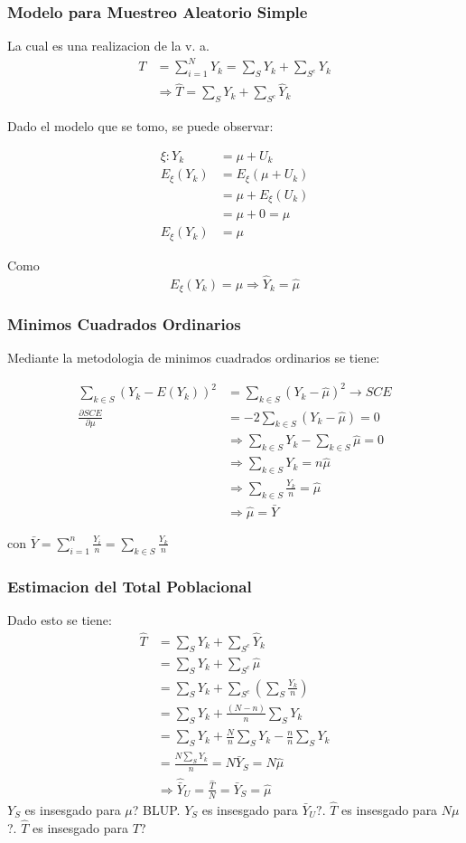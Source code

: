 ﻿\documentclass{beamer}
\begin{document}
\begin{frame}[allowframebreaks*]
\frametitle{Modelo para Muestreo Aleatorio Simple}
La cual es una realizacion de la v. a.
\begin{align*}
T&=\sum\limits_{i=1}^NY_k=\sum\limits_{S}Y_k+\sum\limits_{S^c}Y_k\\
&\Rightarrow \hat T=\sum\limits_{S}Y_k+\sum\limits_{S^c}\hat Y_k
\end{align*}

Dado el modelo que se tomo, se puede observar:

\begin{align*}
\xi:Y_k&=\mu+U_k\\
E_{\xi}(Y_k)&=E_{\xi}(\mu+U_k)\\
&=\mu+E_{\xi}(U_k)\\
&=\mu+0=\mu\\
E_{\xi}(Y_k)&=\mu
\end{align*}

Como $$E_{\xi}(Y_k)=\mu\Rightarrow \hat {Y}_k=\hat\mu$$
\end{frame}

\begin{frame}[allowframebreaks*]
\frametitle{Minimos Cuadrados Ordinarios}
{\footnotesize
Mediante la metodologia de minimos cuadrados ordinarios se tiene:

\begin{align*}
\sum\limits_{k \in S}(Y_k-E(Y_k))^2&=\sum_{k \in S}(Y_k-\hat \mu)^2\rightarrow SCE\\
\frac{\partial SCE}{\partial\mu}&=-2\sum\limits_{k \in S}(Y_k-\hat\mu)=0\\
&\Rightarrow \sum\limits_{k \in S}Y_k-\sum\limits_{k \in S}\hat\mu=0\\
&\Rightarrow \sum\limits_{k \in S}Y_k=n\hat\mu\\
&\Rightarrow \sum\limits_{k \in S}\frac{Y_k}{n}=\hat\mu\\
&\Rightarrow \hat\mu=\bar Y
\end{align*}

con $\bar Y= \sum\limits_{i=1}^n\frac{Y_i}{n}= \sum\limits_{k \in S}\frac{Y_k}{n}$
}
\end{frame}

\begin{frame}[allowframebreaks*]
\frametitle{Estimacion del Total Poblacional}
{\footnotesize
Dado esto se tiene:
\begin{align*}
\hat T&=\sum_S Y_k+\sum_{S^c}\hat Y_k\\
&=\sum_S Y_k+\sum_{S^c}\hat \mu\\
&=\sum_S Y_k+\sum_{S^c}\left(\sum_S\frac{Y_k}{n}\right)\\
&=\sum_SY_k+\frac{(N-n)}{n}\sum_S Y_k\\
&=\sum_SY_k+\frac{N}{n}\sum_SY_k-\frac{n}{n}\sum_SY_k\\
&=\frac{N\sum_S Y_k}{n}=N\bar Y_S=N\hat\mu\\
&\Rightarrow \hat{\bar {Y}}_U=\frac{\hat T}{N}=\bar Y_S=\hat\mu
\end{align*}
$Y_S$ es insesgado para $\mu$? BLUP. $Y_S$ es insesgado para $\bar Y_U?$. $\hat T$ es insesgado para $N\mu$?. $\hat T$ es insesgado para $T$?
}
\end{frame}
\end{document}
